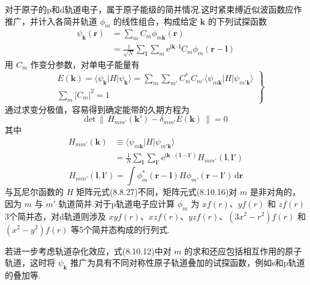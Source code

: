 对于原子的p和d轨道电子，属于原子能级的简并情况.这时紧束缚近似波函数应作推广，并计入各简并轨道 $\phi_{m}$ 的线性组合，构成给定 $\boldsymbol{k}$ 的下列试探函数
\begin{equation}
\begin{aligned}
  \psi_{\boldsymbol{k}}(\boldsymbol{r})&=\sum_{m}C_{m}\phi_{m\boldsymbol{k}}(\boldsymbol{r})\\
  &=\frac{1}{\sqrt{N}}\sum_{\boldsymbol{l}}\sum_{m}\mathrm{e}^{\mathrm{i}\boldsymbol{k}\cdot\boldsymbol{l}}C_{m}\phi_{m}(\boldsymbol{r}-\boldsymbol{l})
\end{aligned}
\end{equation}
用 $C_{m}$ 作变分参数，对单电子能量有
\begin{equation}
  \left.
  \begin{aligned}
    &E(\boldsymbol{k})=\langle\psi_{\boldsymbol{k}}|H|\psi_{\boldsymbol{k}}\rangle
    =\sum_{m}\sum_{m'}C_{m}^{*}C_{m'}\langle\psi_{m\boldsymbol{k}}|H|\psi_{m'\boldsymbol{k}}\rangle\\[0.3em]
    &\sum_{m}|C_{m}|^{2}=1
  \end{aligned}\right\}
\end{equation}
通过求变分极值，容易得到确定能带的久期方程为
\begin{equation}
  \mathrm{det}\,\|\,H_{mm'}(\boldsymbol{k}')-\delta_{mm'}E(\boldsymbol{k})\,\|=0
\end{equation}
其中
\begin{equation}
\begin{aligned}
  H_{mm'}(\boldsymbol{k})
  &\equiv\langle\psi_{m\boldsymbol{k}}|H|\psi_{m'\boldsymbol{k}}\rangle\\
  &=\frac{1}{N}\sum_{\boldsymbol{l}}\sum_{\boldsymbol{l}'}
  \mathrm{e}^{\mathrm{i}\boldsymbol{k}\cdot(\boldsymbol{l}-\boldsymbol{l}')}H_{mm'}(\boldsymbol{l},\boldsymbol{l}')
\end{aligned}
\end{equation}
\begin{equation}
  H_{mm'}(\boldsymbol{l},\boldsymbol{l}')
  =\int\phi_{m}^{*}(\boldsymbol{r}-\boldsymbol{l})H\phi_{m'}(\boldsymbol{r}-\boldsymbol{l}')\,\mathrm{d}\boldsymbol{r}
\end{equation}
与瓦尼尔函数的 $H$ 矩阵元式(8.8.27)不同，矩阵元式(8.10.16)对 $m$ 是非对角的，因为 $m$ 与 $m'$ 轨道简并.对于p轨道电子应计算 $\phi_{m}$ 为 $xf(r)$、$yf(r)$ 和 $zf(r)$ 3个简并态，对d轨道则涉及 $xyf(r)$、$xzf(r)$、$yzf(r)$、$(3x^{2}-r^{2})f(r)$ 和 $(x^{2}-y^{2})f(r)$ 等5个简并态构成的行列式.

若进一步考虑轨道杂化效应，式(8.10.12)中对 $m$ 的求和还应包括相互作用的原子轨道，这时将 $\psi_{\boldsymbol{k}}$ 推广为具有不同对称性原子轨道叠加的试探函数，例如s和p轨道的叠加等.

